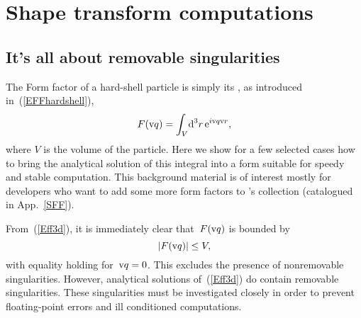 
\chapter{Shape transform computations}  \label{SFFcomp}


\section{It's all about removable singularities}\label{SShapeTrafIntro}

The Form factor of a hard-shell particle is simply its ,
as introduced in~(\ref{EFFhardshell}),
\begin{equation}\label{Eff3d}
  F(\text{v}{q})=\int_V\!\text{d}^3r\, \text{e}^{i\text{v}{q}\text{v}{r}},
\end{equation}
where $V$ is the volume of the particle.
Here we show for a few selected cases
how to bring the analytical solution of this integral into a form
 suitable for speedy and stable computation.
This background material is of interest mostly for
developers who want to add some more form factors to \BornAgain's collection
(catalogued in App.~\ref{SFF}).

%
From~(\ref{Eff3d}), it is immediately clear that~$F(\text{v}{q})$ is bounded by
\begin{equation}
  |F(\text{v}{q})|\le V,
\end{equation}
with equality holding for~$\text{v}{q}=0$.
This excludes the presence of nonremovable singularities.
However, analytical solutions of~(\ref{Eff3d}) do contain
removable singularities.
These singularities must be investigated closely
in order to prevent floating-point errors and ill conditioned computations.

